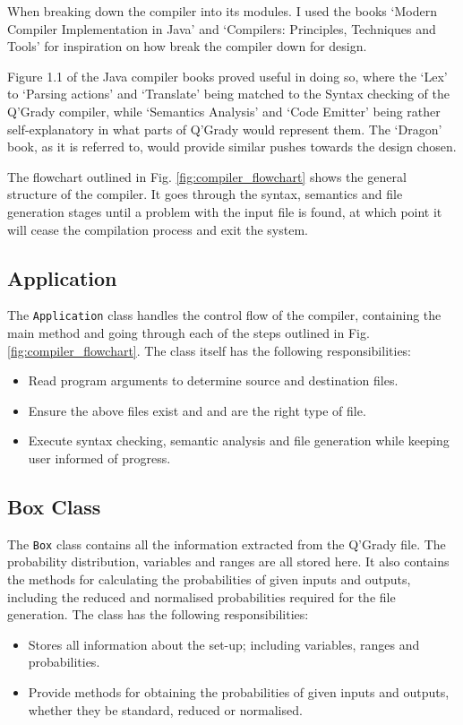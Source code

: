 \documentclass[report.tex]{subfiles}
\begin{document}
When breaking down the compiler into its modules. I used the books `Modern
Compiler Implementation in Java' \cite[Figure~1.1]{java_compiler} and 
`Compilers: Principles, Techniques and Tools'\cite{dragon_compiler} for
inspiration on how break the compiler down for design. 

Figure 1.1 of the Java compiler books proved useful in doing so, where the `Lex'
to `Parsing  actions' and `Translate' being matched to the Syntax checking of
the Q'Grady compiler, while `Semantics Analysis' and `Code Emitter' being rather
self-explanatory in what parts of Q'Grady would represent them. The `Dragon'
book, as it is referred to, would provide similar pushes towards the design
chosen.

The flowchart outlined in Fig. \ref{fig:compiler_flowchart} shows the general
structure of the compiler. It goes through the syntax, semantics and file
generation stages until a problem with the input file is found, at which point
it will cease the compilation process and exit the system.

\subsection{Application} %
\label{sub:application}
The \texttt{Application} class handles the control flow of the compiler,
containing the main method and going through each of the steps outlined in Fig.
\ref{fig:compiler_flowchart}. The class itself has the following 
responsibilities:
\begin{itemize}
    \item Read program arguments to determine source and destination files.
    \item Ensure the above files exist and and are the right type of file.
    \item Execute syntax checking, semantic analysis and file generation while
    keeping user informed of progress.
\end{itemize}

\subsection{Box Class} %
\label{sub:box_class}
The \texttt{Box} class contains all the information extracted from the Q'Grady
file. The probability distribution, variables and ranges are all stored here. It
also contains the methods for calculating the probabilities of given inputs and
outputs, including the reduced and normalised probabilities required for the
file generation. The class has the following responsibilities:
\begin{itemize}
    \item Stores all information about the set-up; including variables, ranges
    and probabilities.
    \item Provide methods for obtaining the probabilities of given inputs and
    outputs, whether they be standard, reduced or normalised.
\end{itemize}
\end{document}
